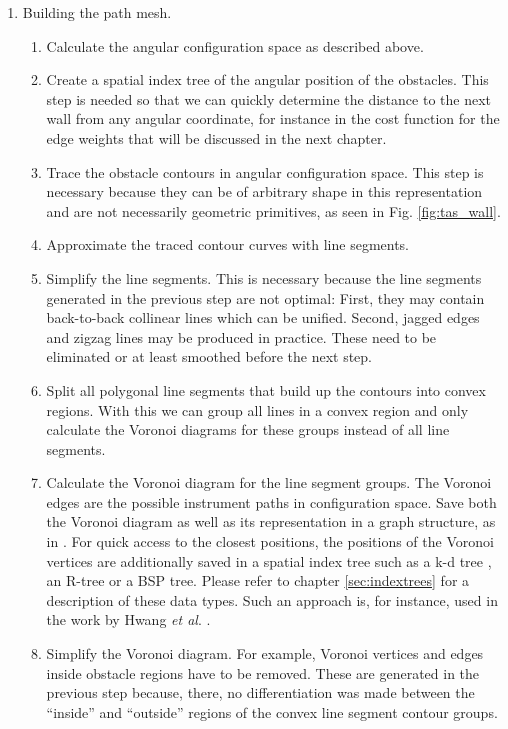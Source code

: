 \begin{enumerate}
	\item Building the path mesh.
	\begin{enumerate}
		\item Calculate the angular configuration space as described above.
		\item Create a spatial index tree of the angular position of the obstacles.
			This step is needed so that we can quickly determine the distance to
			the next wall from any angular coordinate, for instance in the cost
			function for the edge weights that will be discussed in the next chapter.
		\item Trace the obstacle contours in angular configuration space. 
			This step is necessary because they can be of arbitrary
			shape in this representation and are not necessarily geometric 
			primitives, as seen in Fig. \ref{fig:tas_wall}.
		\item Approximate the traced contour curves with line segments.
		\item Simplify the line segments. This is necessary because the line 
			segments generated in the previous step are not optimal:
			First, they may contain back-to-back collinear lines which can be 
			unified. Second, jagged edges and zigzag lines may be
			produced in practice. These need to be eliminated or at least smoothed 
			before the next step.
		\item Split all polygonal line segments that build up the contours into 
			convex regions. With this we can group all lines in a convex region 
			and only calculate the Voronoi diagrams for these groups instead of 
			all line segments.
		\item Calculate the Voronoi diagram for the line segment groups. 
			The Voronoi edges are the possible instrument paths in configuration 
			space. Save both the Voronoi diagram as well as its representation 
			in a graph structure, as in \cite[p. 163]{Berg2008}.
			For quick access to the closest positions, the positions of the
			Voronoi vertices are additionally saved in a spatial index tree such as a 
			k-d tree \cite{TODO}, an R-tree \cite{TODO} or a BSP tree. 
			Please refer to chapter \ref{sec:indextrees} for a description of these data types.
			Such an approach is, for instance, used in the work by 
			Hwang \textit{et al}. \cite{Hwang2003}.
		\item Simplify the Voronoi diagram. For example, Voronoi vertices and 
			edges inside obstacle regions have to be removed.
			These are generated in the previous step because, there, no 
			differentiation was made between the ``inside'' and ``outside'' 
			regions of the convex line segment contour groups.
	\end{enumerate}


\end{enumerate}
